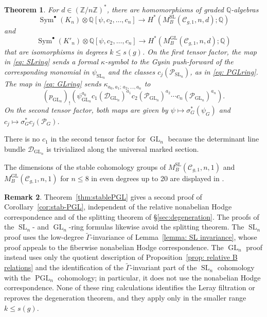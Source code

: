 \documentclass[11pt,reqno]{amsart}
\theoremstyle{plain} %
\newtheorem{theorem}{Theorem}[section]
\theoremstyle{definition}
\newtheorem{remark}[theorem]{Remark}
\newcommand{\QQ}{\mathbb{Q}}
\newcommand{\C}{\mathcal{C}}
\newcommand{\ZZ}{\mathbb{Z}}
\DeclareMathOperator{\GL}{GL}
\DeclareMathOperator{\SL}{SL}
\DeclareMathOperator{\PGL}{PGL}
\DeclareMathOperator{\Sym}{Sym}
\begin{document}
\begin{theorem} \label{thm:sl-stable-ring}
For $d \in (\ZZ/n\ZZ)^*$, there are homomorphisms of graded $\QQ$-algebras
\begin{equation}\label{eq: SLring}
\Sym^\bullet(K_n) \otimes \QQ[\psi,c_2,\dots,c_n] \longrightarrow H^*(M^{\SL}_B(\C_{g,1},n,d);\QQ)
\end{equation}
and
\begin{equation}\label{eq: GLring}
\Sym^\bullet(K'_n) \otimes \QQ[\psi,c_2,\dots,c_n] \longrightarrow H^*(M^{\GL}_B(\C_{g,1},n,d);\QQ)
\end{equation}
that are isomorphisms in degrees $k \leq s(g)$. On the first tensor factor, the map in \eqref{eq: SLring} sends a formal $\kappa$-symbol to the Gysin push-forward of the corresponding monomial in $\psi_{\SL_n}$ and the classes $c_j(\mathcal P_{\SL_n})$, as in \eqref{eq: PGLring}. The map in \eqref{eq: GLring} sends $\kappa_{a_0,a_1;\,a_2,\ldots,a_n}$ to
\[
(p_{\GL_n})_!\left(\psi_{\GL_n}^{a_0}c_1(\mathcal D_{\GL_n})^{a_1}c_2(\mathcal P_{\GL_n})^{a_2}\cdots c_n(\mathcal P_{\GL_n})^{a_n}\right).
\]
On the second tensor factor, both maps are given by $\psi\mapsto\sigma_G^*(\psi_G)$ and $c_j\mapsto\sigma_G^*c_j(\mathcal P_G)$.
\end{theorem}

 \noindent There is no $c_1$ in the second tensor factor for $\GL_n$ because the determinant line bundle $\mathcal D_{\GL_n}$ is trivialized along the universal marked section.
 
 The dimensions of the stable cohomology groups of $M_B^{\SL}(\C_{g,1},n,1)$ and $M_B^{\GL}(\C_{g,1},n,1)$ for $n \leq 8$ in even degrees up to 20 are displayed in .


\begin{remark}
Theorem~\ref{thm:stablePGL} gives a second proof of Corollary~\ref{cor:stab-PGL}, independent of the relative nonabelian Hodge correspondence and of the splitting theorem of \S\ref{sec:degeneration}. The proofs of the $\SL_n$- and $\GL_n$-ring formulas likewise avoid the splitting theorem. The $\SL_n$ proof uses the low-degree $\widetilde\Gamma$-invariance of Lemma~\ref{lemma: SL invariance}, whose proof appeals to the fiberwise nonabelian Hodge correspondence. The $\GL_n$ proof instead uses only the quotient description of Proposition~\ref{prop: relative B relations} and the identification of the $\widetilde\Gamma$-invariant part of the $\SL_n$ cohomology with the $\PGL_n$ cohomology; in particular, it does not use the nonabelian Hodge correspondence. None of these ring calculations identifies the Leray filtration or reproves the degeneration theorem, and they apply only in the smaller range $k\leq s(g)$.
\end{remark}
\end{document}
